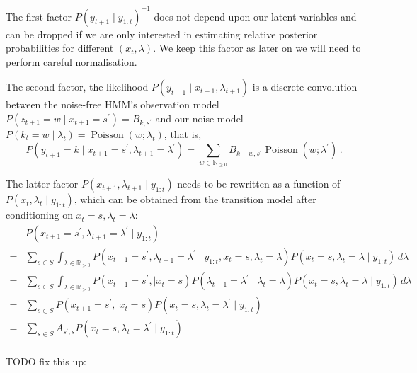 \documentclass[twoside, 11pt]{article}
\DeclareMathOperator*{\poissond}{Poisson}
\newcommand{\reals}[0] {\mathbb{R}}
\newcommand{\nonnegint}[0] {\mathbb{N}_{\geq 0}}
\begin{document}
The first factor $P(y_{t+1} \mid y_{1:t})^{-1}$ does not depend upon our latent variables and can be dropped if we are only interested in estimating relative posterior probabilities for different $(x_t, \lambda)$. We keep this factor as later on we will need to perform careful normalisation.

The second factor, the likelihood $P(y_{t+1} \mid x_{t+1}, \lambda_{t+1})$ is a discrete convolution between the noise-free HMM's observation model $P(z_{t+1}=w \mid x_{t+1}=s^{\prime}) = B_{k,s^{\prime}}$ and our noise model $P(k_t=w \mid \lambda_t) = \poissond(w ; \lambda_t)$, that is,
\begin{equation}
P(y_{t+1}=k \mid x_{t+1}=s^{\prime}, \lambda_{t+1}=\lambda^{\prime})
=
\sum_{w \in \nonnegint} B_{k-w,s^{\prime}} \poissond(w ; \lambda^{\prime}) \, .
\end{equation}

The latter factor $P(x_{t+1}, \lambda_{t+1} \mid y_{1:t})$ needs to be rewritten as a function of $P(x_{t}, \lambda_{t} \mid y_{1:t})$, which can be obtained from the transition model after conditioning on $x_t=s, \lambda_t=\lambda$:
\begin{align}
& P(x_{t+1}=s^{\prime}, \lambda_{t+1}=\lambda^{\prime} \mid y_{1:t}) \nonumber \\
= & \sum_{s \in S} \int_{\lambda \in \reals_{>0}}
P(x_{t+1}=s^{\prime}, \lambda_{t+1}=\lambda^{\prime} \mid y_{1:t}, x_t=s, \lambda_t=\lambda ) P(x_t=s, \lambda_t=\lambda \mid y_{1:t} ) \,d\lambda \nonumber \\
= & \sum_{s \in S} \int_{\lambda \in \reals_{>0}}
P(x_{t+1}=s^{\prime}, \mid x_t=s)
P(\lambda_{t+1}=\lambda^{\prime} \mid \lambda_t=\lambda ) P(x_t=s, \lambda_t=\lambda \mid y_{1:t} ) \,d\lambda \nonumber \\
= & \sum_{s \in S}
P(x_{t+1}=s^{\prime}, \mid x_t=s)
P(x_t=s, \lambda_t=\lambda^{\prime} \mid y_{1:t} ) \nonumber \\
= & \sum_{s \in S}
A_{s^{\prime}, s}
P(x_t=s, \lambda_t=\lambda^{\prime} \mid y_{1:t} ) \nonumber \\
\label{eqn:advance}
\end{align}

TODO fix this up:
\end{document}
